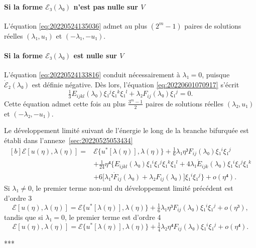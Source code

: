 \documentclass[12pt, final]{scrartcl}
\theoremstyle{definition}
\begin{document}
\paragraph{Si la forme \(ℰ₃(λ₀)\) n'est pas nulle sur \(V\)} L'équation
\eqref{eq:20220524135036} admet au plus \((2^m - 1)\) paires de solutions
réelles \((λ₁, u₁)\) et \((- λ₁, - u₁)\). 

\paragraph{Si la forme \(ℰ₃(λ₀)\) est nulle sur \(V\)} L'équation
\eqref{eq:20220524133816} conduit nécessairement à \(λ₁ = 0\), puisque
\(\dot{ℰ}₂(λ₀)\) est définie négative. Dès lors, l'équation
\eqref{eq:20220601070917} s'écrit 
\begin{equation}
 \tfrac{1}{3} E_{ijkl}(λ₀) ξ₁^j ξ₁^k ξ₁^l + λ₂ F_{ij}(λ₀) ξ₁^j = 0.
\end{equation}
Cette équation admet cette fois au plus \(\frac{3^m - 1}{2}\) paires de
solutions réelles \((λ₂, u₁)\) et \((- λ₂, - u₁)\). 

Le développement limité suivant de l'énergie le long de la branche bifurquée est
établi dans l'annexe~\ref{sec:20220525053434}
\begin{equation}
  \label{eq:20220525053600}
  \begin{aligned}[b]
    ℰ[u(η), λ(η)] ={}
    & ℰ\{u^{\ast}[λ(η)], λ(η)\} + \tfrac{1}{6} λ₁ η³ F_{i j}(λ₀) ξ₁^i ξ₁^j\\
    & + \tfrac{1}{24} η⁴ \bigl\{E_{ijkl}(λ₀) ξ₁^i ξ₁^j ξ₁^k ξ₁^l + 4λ₁ \dot{E}_{ijk}(λ₀) ξ₁^i ξ₁^j ξ₁^k\\
    & + 6 \bigl[λ₁² \dot{F}_{ij}(λ₀) + λ₂ F_{ij}(λ₀)\bigr] ξ₁^i ξ₁^j\bigr\} + o(η⁴).
  \end{aligned}
\end{equation}
Si \(λ₁ ≠ 0\), le premier terme non-nul du développement limité précédent est
d'ordre 3
\begin{equation}
 ℰ [u(η), λ(η)] = ℰ\{u^{\ast}[λ(η)], λ(η)\} + \tfrac{1}{6} λ₁ η³ F_{ij}(λ₀) ξ₁^i ξ₁^j + o(η³),
\end{equation}
tandis que si \(λ₁ = 0\), le premier terme est d'ordre 4
\begin{equation}
 ℰ[u(η), λ(η)] = ℰ\{u^{\ast} [λ(η)], λ(η)\} + \tfrac{1}{4} λ₂ η⁴ F_{ij}(λ₀) ξ₁^i ξ₁^j + o(η⁴).
\end{equation}
\begin{center}
 ***
\end{center}
\end{document}
